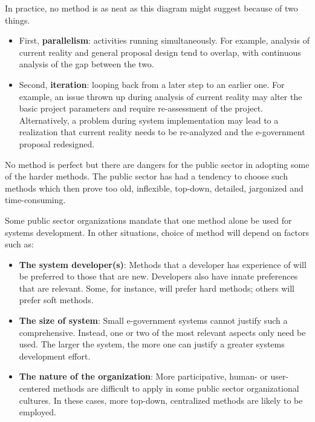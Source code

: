 In practice, no method is as neat as this diagram might suggest because of two things.
\begin{itemize}
	\item First, \textbf{parallelism}: activities running simultaneously. For example, analysis of current reality and general proposal design tend to	overlap, with continuous analysis of the
	gap between the two. 
	\item Second, \textbf{iteration}: looping back from a later step to an earlier one. For example, an issue thrown up	during analysis of current reality may alter the basic project parameters and require	re-assessment of the project. Alternatively, a problem during system implementation	may lead to a realization that current reality needs to be re-analyzed and the e-government proposal redesigned.
\end{itemize}


No method is perfect but there are dangers for the public sector in adopting
some of the harder methods. The public sector has had a tendency to choose such
methods which then prove too old, inflexible, top-down, detailed, jargonized and time-consuming.

Some public sector organizations mandate that one method alone be used for
systems development. In other situations,
choice of method will depend on factors
such as:

\begin{itemize}
	\item \textbf{The system developer(s)}: Methods that a developer has experience of will be preferred to those that are new. Developers	also have innate preferences that are relevant. Some, for instance, will prefer hard methods; others will prefer soft methods.
	
	\item \textbf{The size of system}: Small e-government
	systems cannot justify such a comprehensive. Instead, one or two of the most relevant
	aspects only need be used. The larger the
	system, the more one can justify a
	greater systems development effort.
	
	\item \textbf{The nature of the organization}: More participative, human- or user-centered methods are difficult to apply in some
	public sector organizational cultures. In
	these cases, more top-down, centralized
	methods are likely to be employed.
\end{itemize}


